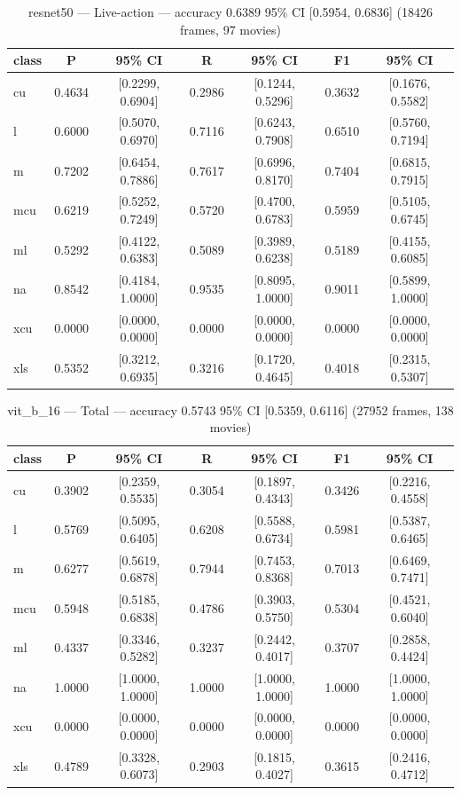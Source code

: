 \begin{table}[htbp]
\centering
\caption{resnet50 — Live-action — accuracy 0.6389 95\% CI [0.5954, 0.6836] (18426 frames, 97 movies)}
\label{tab:resnet50-live-action}
\begin{tabular}{lcccccc}
\toprule
class & P & 95\% CI & R & 95\% CI & F1 & 95\% CI \\
\midrule
cu & 0.4634 & [0.2299, 0.6904] & 0.2986 & [0.1244, 0.5296] & 0.3632 & [0.1676, 0.5582] \\
l & 0.6000 & [0.5070, 0.6970] & 0.7116 & [0.6243, 0.7908] & 0.6510 & [0.5760, 0.7194] \\
m & 0.7202 & [0.6454, 0.7886] & 0.7617 & [0.6996, 0.8170] & 0.7404 & [0.6815, 0.7915] \\
mcu & 0.6219 & [0.5252, 0.7249] & 0.5720 & [0.4700, 0.6783] & 0.5959 & [0.5105, 0.6745] \\
ml & 0.5292 & [0.4122, 0.6383] & 0.5089 & [0.3989, 0.6238] & 0.5189 & [0.4155, 0.6085] \\
na & 0.8542 & [0.4184, 1.0000] & 0.9535 & [0.8095, 1.0000] & 0.9011 & [0.5899, 1.0000] \\
xcu & 0.0000 & [0.0000, 0.0000] & 0.0000 & [0.0000, 0.0000] & 0.0000 & [0.0000, 0.0000] \\
xls & 0.5352 & [0.3212, 0.6935] & 0.3216 & [0.1720, 0.4645] & 0.4018 & [0.2315, 0.5307] \\
\bottomrule
\end{tabular}
\end{table}

\begin{table}[htbp]
\centering
\caption{vit\_b\_16 — Total — accuracy 0.5743 95\% CI [0.5359, 0.6116] (27952 frames, 138 movies)}
\label{tab:vit-b-16-total}
\begin{tabular}{lcccccc}
\toprule
class & P & 95\% CI & R & 95\% CI & F1 & 95\% CI \\
\midrule
cu & 0.3902 & [0.2359, 0.5535] & 0.3054 & [0.1897, 0.4343] & 0.3426 & [0.2216, 0.4558] \\
l & 0.5769 & [0.5095, 0.6405] & 0.6208 & [0.5588, 0.6734] & 0.5981 & [0.5387, 0.6465] \\
m & 0.6277 & [0.5619, 0.6878] & 0.7944 & [0.7453, 0.8368] & 0.7013 & [0.6469, 0.7471] \\
mcu & 0.5948 & [0.5185, 0.6838] & 0.4786 & [0.3903, 0.5750] & 0.5304 & [0.4521, 0.6040] \\
ml & 0.4337 & [0.3346, 0.5282] & 0.3237 & [0.2442, 0.4017] & 0.3707 & [0.2858, 0.4424] \\
na & 1.0000 & [1.0000, 1.0000] & 1.0000 & [1.0000, 1.0000] & 1.0000 & [1.0000, 1.0000] \\
xcu & 0.0000 & [0.0000, 0.0000] & 0.0000 & [0.0000, 0.0000] & 0.0000 & [0.0000, 0.0000] \\
xls & 0.4789 & [0.3328, 0.6073] & 0.2903 & [0.1815, 0.4027] & 0.3615 & [0.2416, 0.4712] \\
\bottomrule
\end{tabular}
\end{table}

